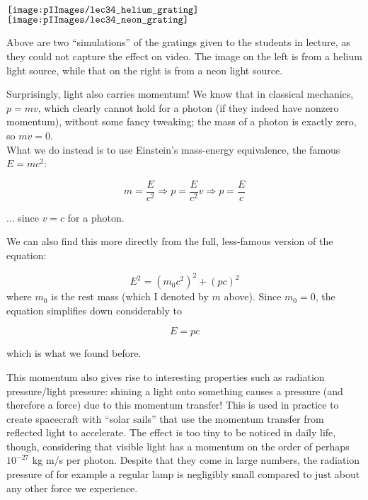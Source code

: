 \begin{center}
$\vcenter{\hbox{\texttt{[image: \\pIImages/lec34\_helium\_grating]}}}$
$\vcenter{\hbox{\texttt{[image: \\pIImages/lec34\_neon\_grating]}}}$
\end{center}

Above are two ``simulations'' of the gratings given to the students in lecture, as they could not capture the effect on video. The image on the left is from a helium light source, while that on the right is from a neon light source.

Surprisingly, light also carries momentum! We know that in classical mechanics, $p = m v$, which clearly cannot hold for a photon (if they indeed have nonzero momentum), without some fancy tweaking; the mass of a photon is exactly zero, so $m v = 0$.\\
What we do instead is to use Einstein's mass-energy equivalence, the famous $E = m c^2$:

\begin{equation}
m = \frac{E}{c^2} \Rightarrow p = \frac{E}{c^2} v \Rightarrow p = \frac{E}{c}
\end{equation}

... since $v = c$ for a photon.

We can also find this more directly from the full, less-famous version of the equation:

\begin{equation}
E^2 = (m_0 c^2)^2 + (p c)^2
\end{equation}
where $m_0$ is the rest mass (which I denoted by $m$ above). Since $m_0 = 0$, the equation simplifies down considerably to

\begin{equation}
E = p c
\end{equation}

which is what we found before.

This momentum also gives rise to interesting properties such as radiation pressure/light pressure: shining a light onto something causes a pressure (and therefore a force) due to this momentum transfer! This is used in practice to create spacecraft with ``solar sails'' that use the momentum transfer from reflected light to accelerate. The effect is too tiny to be noticed in daily life, though, considering that visible light has a momentum on the order of perhaps $10^{-27}$ kg m/s per photon. Despite that they come in large numbers, the radiation pressure of for example a regular lamp is negligibly small compared to just about any other force we experience.

